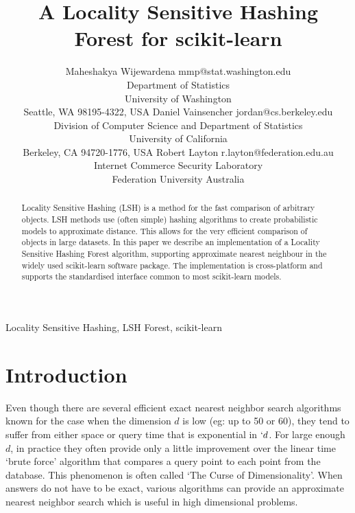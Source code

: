 \documentclass[twoside,11pt]{article}
\begin{document}
\title{A Locality Sensitive Hashing Forest for scikit-learn}

\author{\name Maheshakya Wijewardena \email mmp@stat.washington.edu \\
       \addr Department of Statistics\\
       University of Washington\\
       Seattle, WA 98195-4322, USA
       \AND
       \name Daniel Vainsencher \email jordan@cs.berkeley.edu \\
       \addr Division of Computer Science and Department of Statistics\\
       University of California\\
       Berkeley, CA 94720-1776, USA
       \AND Robert Layton \email r.layton@federation.edu.au \\
       \addr Internet Commerce Security Laboratory \\
       Federation University Australia
       }


\maketitle

\begin{abstract}%
Locality Sensitive Hashing (LSH) is a method for the fast comparison of arbitrary objects.
LSH methods use (often simple) hashing algorithms to create probabilistic models to approximate distance.
This allows for the very efficient comparison of objects in large datasets.
In this paper we describe an implementation of a Locality Sensitive Hashing Forest algorithm, supporting approximate nearest neighbour in the widely used scikit-learn software package.
The implementation is cross-platform and supports the standardised interface common to most scikit-learn models.
\end{abstract}

\begin{keywords}
  Locality Sensitive Hashing, LSH Forest, scikit-learn
\end{keywords}

\section{Introduction}

Even though there are several efficient exact nearest neighbor search
algorithms known for the case when the dimension $d$ is low (eg: up to 50
or 60), they tend to suffer from either space or query time that is exponential
in $`d$.
For large enough $d$, in practice they often provide only a little improvement over the linear time `brute force' algorithm that
compares a query point to each point from the database.
This phenomenon is often called `The Curse of Dimensionality'.
When answers do not have to be exact, various algorithms can provide an approximate nearest
neighbor search which is useful in high dimensional problems.
\end{document}
